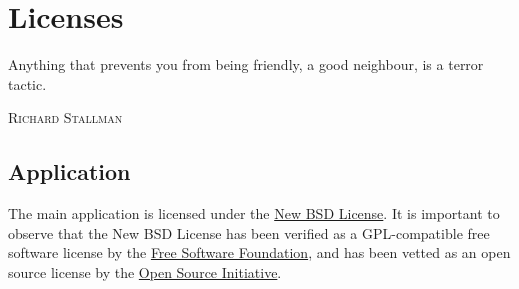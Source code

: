\chapter*{Licenses}
\label{chap:license}

\epigraph{Anything that prevents you from being friendly, a good neighbour, is a terror tactic.}{\textsc{Richard Stallman}}

\section*{Application}
\label{sec:licenseapplication}

The main application is licensed under the \href{http://www.opensource.org/licenses/bsd-license.php}{New BSD License}. It is important to observe that the New BSD License has been verified as a GPL-compatible free software license by the \href{http://www.fsf.org/}{Free Software Foundation}, and has been vetted as an open source license by the \href{http://www.opensource.org/}{Open Source Initiative}.

\vspace{1em}

